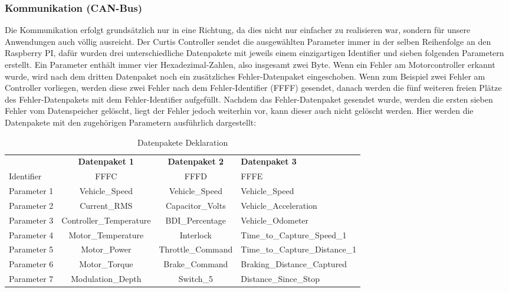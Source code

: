 \newpage

\subsubsection{Kommunikation (CAN-Bus)}
Die Kommunikation erfolgt grundsätzlich nur in eine Richtung, da dies nicht nur einfacher zu realisieren war, sondern für unsere Anwendungen auch völlig ausreicht. Der Curtis Controller sendet die ausgewählten Parameter immer in der selben Reihenfolge an den Raspberry PI, dafür wurden drei unterschiedliche Datenpakete mit jeweils einem einzigartigen Identifier und sieben folgenden Parametern erstellt. Ein Parameter enthält immer vier Hexadezimal-Zahlen, also insgesamt zwei Byte. Wenn ein Fehler am Motorcontroller erkannt wurde, wird nach dem dritten Datenpaket noch ein zusätzliches Fehler-Datenpaket eingeschoben. Wenn zum Beispiel zwei Fehler am Controller vorliegen, werden diese zwei Fehler nach dem Fehler-Identifier (FFFF) gesendet, danach werden die fünf weiteren freien Plätze des Fehler-Datenpakets mit dem Fehler-Identifier aufgefüllt. Nachdem das Fehler-Datenpaket gesendet wurde, werden die ersten sieben Fehler vom Datenspeicher gelöscht, liegt der Fehler jedoch weiterhin vor, kann dieser auch nicht gelöscht werden. Hier werden die Datenpakete mit den zugehörigen Parametern ausführlich dargestellt:

\setlength{\tabcolsep}{9pt}
\begin{table}[H]
	\begin{tabular}{|lcc>{\centering\arraybackslash}p{5cm}|}\hline
	\rowcolor[gray]{0.8} & \textbf{Datenpaket 1} & \textbf{Datenpaket 2} & \textbf{Datenpaket 3}\\[3pt]
		Identifier	& FFFC & FFFD & FFFE\\\hline
		Parameter 1 & Vehicle\_Speed & Vehicle\_Speed & Vehicle\_Speed\\\hline
		Parameter 2 & Current\_RMS	& Capacitor\_Volts & Vehicle\_Acceleration\\\hline
		Parameter 3 & Controller\_Temperature & BDI\_Percentage & Vehicle\_Odometer\\\hline
		Parameter 4 & Motor\_Temperature	& Interlock	& Time\_to\_Capture\_Speed\_1\\\hline		
		Parameter 5	& Motor\_Power 	& Throttle\_Command & Time\_to\_Capture\_Distance\_1\\\hline
		Parameter 6	& Motor\_Torque 	& Brake\_Command	& Braking\_Distance\_Captured\\\hline
		Parameter 7 & Modulation\_Depth & Switch\_5 & Distance\_Since\_Stop\\\hline		
	\end{tabular}	
	\caption{Datenpakete Deklaration}
	\label{tab:Datenpakete_Deklaration}
\end{table}

